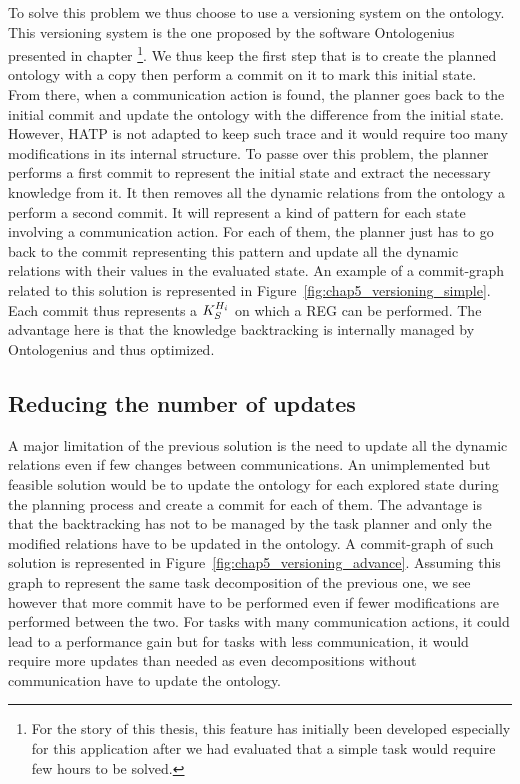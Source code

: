 To solve this problem we thus choose to use a versioning system on the ontology. This versioning system is the one proposed by the software Ontologenius presented in chapter  \footnote{For the story of this thesis, this feature has initially been developed especially for this application after we had evaluated that a simple task would require few hours to be solved.}. We thus keep the first step that is to create the planned ontology with a copy then perform a commit on it to mark this initial state. From there, when a communication action is found, the planner goes back to the initial commit and update the ontology with the difference from the initial state. However, HATP is not adapted to keep such trace and it would require too many modifications in its internal structure. To passe over this problem, the planner performs a first commit to represent the initial state and extract the necessary knowledge from it. It then removes all the dynamic relations from the ontology a perform a second commit. It will represent a kind of pattern for each state involving a communication action. For each of them, the planner just has to go back to the commit representing this pattern and update all the dynamic relations with their values in the evaluated state. An example of a commit-graph related to this solution is represented in Figure~\ref{fig:chap5_versioning_simple}. Each commit thus represents a $K_S^{H_i}$ on which a REG can be performed. The advantage here is that the knowledge backtracking is internally managed by Ontologenius and thus optimized.

\subsection{Reducing the number of updates}

A major limitation of the previous solution is the need to update all the dynamic relations even if few changes between communications. An unimplemented but feasible solution would be to update the ontology for each explored state during the planning process and create a commit for each of them. The advantage is that the backtracking has not to be managed by the task planner and only the modified relations have to be updated in the ontology. A commit-graph of such solution is represented in Figure~\ref{fig:chap5_versioning_advance}. Assuming this graph to represent the same task decomposition of the previous one, we see however that more commit have to be performed even if fewer modifications are performed between the two. For tasks with many communication actions, it could lead to a performance gain but for tasks with less communication, it would require more updates than needed as even decompositions without communication have to update the ontology.

